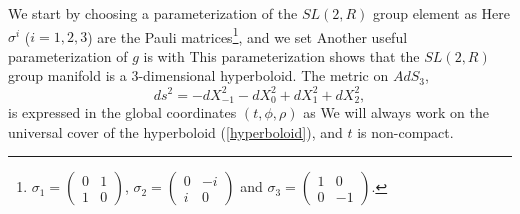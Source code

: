 We start by choosing a parameterization of the $SL(2,R)$ group element as 
Here $\sigma^i$ ($i=1,2,3$) are the Pauli
matrices\footnote{$\sigma_1 = \left(\begin{array}{ll} 
 0 & 1 \\ 1 & 0 \end{array}\right) $,  $\sigma_2 = \left(\begin{array}{ll} 
 0 & -i \\ i & 0 \end{array}\right) $ and
$\sigma_3 = \left(\begin{array}{ll} 
 1 & 0 \\ 0 & -1 \end{array}\right) $. },
and we set 
Another useful parameterization of $g$ is
with
This parameterization shows that the $SL(2,R)$ group manifold
is a $3$-dimensional hyperboloid. The metric on $AdS_3$,
$$ ds^2 = - dX_{-1}^2 - dX_0^2 + dX_1^2 + dX_2^2, $$
is expressed in the global coordinates $(t,\phi,\rho)$
as
 We will always work
on the universal cover of the hyperboloid (\ref{hyperboloid}), 
and $t$ is non-compact.




